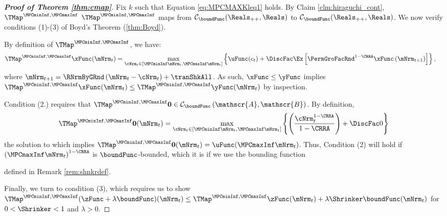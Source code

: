 \documentclass[\econtexRoot/BufferStockTheory]{subfiles}
\begin{document}
\begin{proof}[\textbf{Proof of Theorem \ref{thm:cmap}}]
Fix $k$ such that Equation \eqref{eq:MPCMAXKleq1} holds.
By Claim \ref{clm:hiraguchi_cont}, $\TMap^{\MPCminInf, \MPCmaxInf}$  $\TMap^{\MPCminInf, \MPCmaxInf}$ maps from $\mathcal{C}_{\boundFunc}(\Reals_{++},\Reals)$ to $\mathcal{C}_{\boundFunc}(\Reals_{++},\Reals)$.
We now verify conditions (1)-(3) of Boyd's Theorem (\ref{thm:Boyd}).


 By definition of $\TMap^{\MPCminInf, \MPCmaxInf}$, we have: 
\begin{align}
  \TMap^{\MPCminInf, \MPCmaxInf}{\mathfrak{\xFunc}}(\mNrm_{t}) & = \underset{\cNrm_{t} \in
                                            [\MPCminInf \mNrm_{t}, \MPCmaxInf \mNrm_{t}]
                                            }\max \left\{
                                            \uFunc(c_{t})+\DiscFac \Ex\left[ {\PermGroFacRnd}^{1-\CRRA }{\mathfrak{\xFunc}}
                                            \left( {\mNrm}_{t+1}\right) \right] \right\},    \label{eq:condition1}
\end{align}%
%
where ${\mNrm}_{t+1} = \RNrmByGRnd\left(\mNrm_{t} - \cNrm_{t}\right) + \tranShkAll$.
As such, ${\mathfrak{\xFunc}} \leq {\mathfrak{\yFunc}}$ implies $\TMap^{\MPCminInf, \MPCmaxInf}{\mathfrak{\xFunc}}(\mNrm_{t}) \leq \TMap^{\MPCminInf, \MPCmaxInf}{\mathfrak{\yFunc}} (\mNrm_{t})$ by inspection.

  Condition (2.) requires that $\TMap^{\MPCminInf, \MPCmaxInf}\mathbf{0}\in \mathcal{C}_{\boundFunc}\left(\mathscr{A},\mathscr{B}\right)$.
By definition,
\begin{equation*}
  \TMap^{\MPCminInf, \MPCmaxInf} \mathbf{0}(\mNrm_{t}) = \max_{\cNrm_{t} \in
    [\MPCminInf \mNrm_{t}, \MPCmaxInf \mNrm_{t}]
  }\left\{ \left( \frac{\cNrm_{t}^{1-\CRRA }}{1-\CRRA }\right) +\DiscFac 0\right\}
\end{equation*}
the solution to which implies
$\TMap^{\MPCminInf, \MPCmaxInf} \mathbf{0}(\mNrm_{t}) = \uFunc(\MPCmaxInf \mNrm_{t})$.
Thus, Condition (2)
will hold if ${(\MPCmaxInf \mNrm_{t})}^{1-\CRRA}$ is $\boundFunc$-bounded, which it is if we use the
bounding function

defined in Remark \ref{rem:shnkrdef}.


 Finally, we turn to condition (3), which requires us to show $\TMap^{\MPCminInf, \MPCmaxInf}({\zFunc} +\lambda\boundFunc
)(\mNrm_{t}) \leq\TMap^{\MPCminInf, \MPCmaxInf}{\zFunc}(\mNrm_{t}) +\lambda \Shrinker
\boundFunc(\mNrm_{t})$ for $0<\Shrinker<1$ and $\lambda>0$.


\end{proof}
\end{document}
